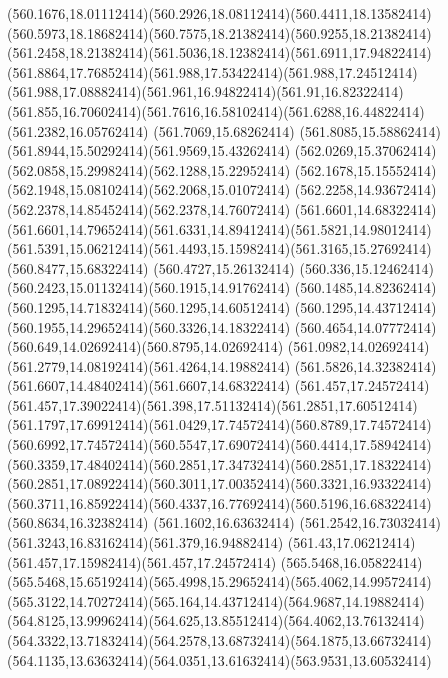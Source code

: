 {{	\curveto(560.1676,18.01112414)(560.2926,18.08112414)(560.4411,18.13582414)
	\curveto(560.5973,18.18682414)(560.7575,18.21382414)(560.9255,18.21382414)
	\curveto(561.2458,18.21382414)(561.5036,18.12382414)(561.6911,17.94822414)
	\curveto(561.8864,17.76852414)(561.988,17.53422414)(561.988,17.24512414)
	\curveto(561.988,17.08882414)(561.961,16.94822414)(561.91,16.82322414)
	\curveto(561.855,16.70602414)(561.7616,16.58102414)(561.6288,16.44822414)
	\lineto(561.2382,16.05762414)
	\lineto(561.7069,15.68262414)
	\curveto(561.8085,15.58862414)(561.8944,15.50292414)(561.9569,15.43262414)
	\curveto(562.0269,15.37062414)(562.0858,15.29982414)(562.1288,15.22952414)
	\curveto(562.1678,15.15552414)(562.1948,15.08102414)(562.2068,15.01072414)
	\curveto(562.2258,14.93672414)(562.2378,14.85452414)(562.2378,14.76072414)
	\closepath
	\moveto(561.6601,14.68322414)
	\curveto(561.6601,14.79652414)(561.6331,14.89412414)(561.5821,14.98012414)
	\curveto(561.5391,15.06212414)(561.4493,15.15982414)(561.3165,15.27692414)
	\lineto(560.8477,15.68322414)
	\lineto(560.4727,15.26132414)
	\curveto(560.336,15.12462414)(560.2423,15.01132414)(560.1915,14.91762414)
	\curveto(560.1485,14.82362414)(560.1295,14.71832414)(560.1295,14.60512414)
	\curveto(560.1295,14.43712414)(560.1955,14.29652414)(560.3326,14.18322414)
	\curveto(560.4654,14.07772414)(560.649,14.02692414)(560.8795,14.02692414)
	\curveto(561.0982,14.02692414)(561.2779,14.08192414)(561.4264,14.19882414)
	\curveto(561.5826,14.32382414)(561.6607,14.48402414)(561.6607,14.68322414)
	\closepath
	\moveto(561.457,17.24572414)
	\curveto(561.457,17.39022414)(561.398,17.51132414)(561.2851,17.60512414)
	\curveto(561.1797,17.69912414)(561.0429,17.74572414)(560.8789,17.74572414)
	\curveto(560.6992,17.74572414)(560.5547,17.69072414)(560.4414,17.58942414)
	\curveto(560.3359,17.48402414)(560.2851,17.34732414)(560.2851,17.18322414)
	\curveto(560.2851,17.08922414)(560.3011,17.00352414)(560.3321,16.93322414)
	\curveto(560.3711,16.85922414)(560.4337,16.77692414)(560.5196,16.68322414)
	\lineto(560.8634,16.32382414)
	\lineto(561.1602,16.63632414)
	\curveto(561.2542,16.73032414)(561.3243,16.83162414)(561.379,16.94882414)
	\curveto(561.43,17.06212414)(561.457,17.15982414)(561.457,17.24572414)
	\closepath
	\moveto(565.5468,16.05822414)
	\curveto(565.5468,15.65192414)(565.4998,15.29652414)(565.4062,14.99572414)
	\curveto(565.3122,14.70272414)(565.164,14.43712414)(564.9687,14.19882414)
	\curveto(564.8125,13.99962414)(564.625,13.85512414)(564.4062,13.76132414)
	\curveto(564.3322,13.71832414)(564.2578,13.68732414)(564.1875,13.66732414)
	\curveto(564.1135,13.63632414)(564.0351,13.61632414)(563.9531,13.60532414)
}}
